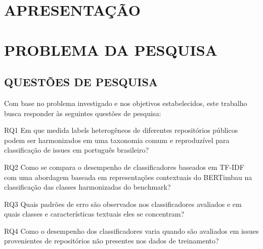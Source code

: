 \documentclass[
    12pt,				       %
    openright,			       %
    oneside,			       %
    a4paper,			       %
    chapter=TITLE,             %
    sumario=tradicional,       %
    english,			        %
    brazil, 				    %
 ]{abntex2}
\begin{document}

\pagestyle{simple}


\chapter{APRESENTAÇÃO}\label{sec:introducao}




\chapter{PROBLEMA DA PESQUISA}\label{sec:problema}

\section{QUESTÕES DE PESQUISA}\label{sec:questoes-pesquisa}

Com base no problema investigado e nos objetivos estabelecidos, este trabalho busca responder às seguintes questões de pesquisa:

\begin{description}
    \item RQ1 Em que medida labels heterogêneos de diferentes repositórios públicos podem ser harmonizados em uma taxonomia comum e reproduzível para classificação de issues em português brasileiro?
    \item RQ2 Como se compara o desempenho de classificadores baseados em TF-IDF com uma abordagem baseada em representações contextuais do BERTimbau na classificação das classes harmonizadas do benchmark?
    \item RQ3 Quais padrões de erro são observados nos classificadores avaliados e em quais classes e características textuais eles se concentram?
    \item RQ4 Como o desempenho dos classificadores varia quando são avaliados em issues provenientes de repositórios não presentes nos dados de treinamento?
\end{description}
\end{document}

